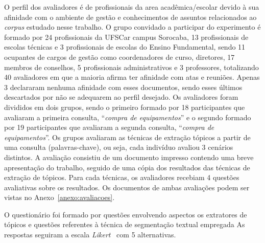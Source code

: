 O perfil dos avaliadores é de profissionais da area acadêmica/escolar devido à sua afinidade com o ambiente de gestão e conhecimentos de assuntos relacionados ao \textit{corpus} estudado nesse trabalho. O grupo convidado a participar do experimento é formado por 24 profissionais da UFSCar campus Sorocaba, 13 profissionais de escolas técnicas e 3 profissionais de escolas do Ensino Fundamental, sendo 11 ocupantes de cargos de gestão como coordenadores de curso, diretores, 17 membros de conselhos, 5 profissionais administrativos e 3 professores, totalizando 40 avaliadores em que a maioria afirma ter afinidade com atas e reuniões. Apenas 3 declararam nenhuma afinidade com esses documentos, sendo esses últimos descartados por não se adequarem ao perfil desejado. Os avaliadores foram divididos em dois grupos, sendo o primeiro formado por 18 participantes que avaliaram a primeira consulta, ``\textit{compra de equipamentos}'' e o segundo formado por 19 participantes que avaliaram a segunda consulta, ``\textit{compra de equipamentos}''. Os grupos avaliaram as técnicas de extração tópicos a partir de uma consulta (palavras-chave), ou seja, cada indivíduo avaliou 3 cenários distintos. A avaliação consistiu de um documento impresso contendo uma breve apresentação do trabalho, seguido de uma cópia dos resultados das técnicas de extração de tópicos. Para cada técnicas, os avaliadores recebiam 4 questões avaliativas sobre os resultados. Os documentos de ambas avaliações podem ser vistas no Anexo~\ref{anexo:avaliacoes}.


O questionário foi formado por questões envolvendo aspectos os extratores de tópicos e questões referentes à técnica de segmentação textual empregada
As respostas seguiram a escala \textit{Likert}~\cite{Norman2010} com 5 alternativas. 



